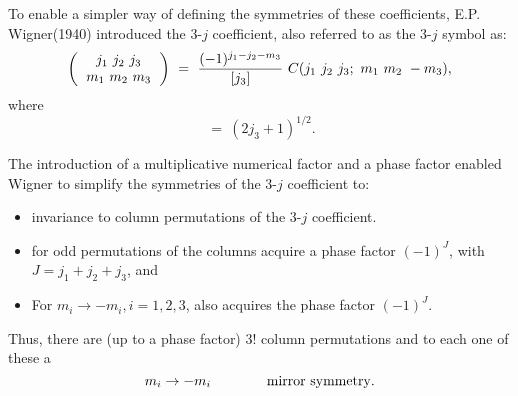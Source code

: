 To enable a simpler way of defining the symmetries of these coefficients, E.P. Wigner(1940) 
introduced the 3-$j$ coefficient, also referred to as the 3-$j$ symbol as:
\begin{equation}
\left(
\begin{tabular}{ccc}
$j_1\ j_2\ j_3$ \\ $m_1\ m_2\ m_3$ \\ 
\end{tabular} 
\right) 
\ = \ \frac{(-1)^{j_1-j_2-m_3}}{[j_3]}\ C(j_1\ j_2\ j_3;\ m_1\ m_2\ -m_3), \label{chap29-eq7}
\end{equation}
where
\begin{equation}
[j_3]\ =\ (2j_3 + 1)^{1/2}.\label{chap29-eq8}
\end{equation}

The introduction of a multiplicative numerical factor and a phase factor enabled 
Wigner to simplify the symmetries of the 3-$j$ coefficient to:
\begin{itemize}
\item invariance to column permutations of the 3-$j$ coefficient.
\item for odd permutations of the columns acquire a phase factor $(-1)^J$, with $J=j_1+j_2+j_3$, and 
\item For $m_i \rightarrow -m_i, i=1,2,3$,  also acquires the phase factor $(-1)^J$.
\end{itemize}

Thus, there are (up to a phase factor) 3! column permutations and to each one of these a 
\begin{equation}
m_i \rightarrow -m_i \qquad \qquad {\rm mirror\ symmetry}.\label{chap29-eq9}
\end{equation}

